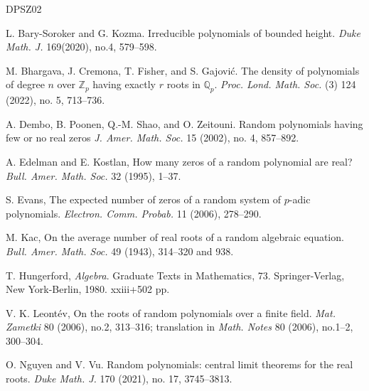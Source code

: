 \documentclass[12pt]{amsart}
\theoremstyle{definition}
\newcommand{\QQ}{\mathbb{Q} }
\newcommand{\ZZ}{\mathbb{Z} }
\begin{document}
\begin{thebibliography}{DPSZ02}

L. Bary-Soroker and G. Kozma.
Irreducible polynomials of bounded height.
{\em Duke Math. J.} 169(2020), no.4, 579--598.

M. Bhargava, J. Cremona, T. Fisher, and S. Gajovi\'c. 
The density of polynomials of degree $n$ over $\ZZ_p$ having exactly $r$ roots in $\QQ_p$.
{\em Proc. Lond. Math. Soc.} (3) 124 (2022), no. 5, 713--736.

A. Dembo, B. Poonen, Q.-M. Shao, and O. Zeitouni. 
Random polynomials having few or no real zeros
{\em J. Amer. Math. Soc.} 15 (2002), no. 4, 857--892.

A. Edelman and E. Kostlan, 
How many zeros of a random polynomial are real?
{\em Bull. Amer. Math. Soc.} 32 (1995), 1--37.

S. Evans, 
The expected number of zeros of a random system of $p$-adic polynomials.
{\em Electron. Comm. Probab.} 11 (2006), 278--290.

M. Kac, 
On the average number of real roots of a random algebraic equation. 
{\em Bull. Amer. Math. Soc.} 49 (1943), 314--320 and 938.

T. Hungerford,
{\em Algebra}.
Graduate Texts in Mathematics, 73.
Springer-Verlag, New York-Berlin, 1980. xxiii+502 pp.

V. K. Leont\'ev, 
On the roots of random polynomials over a finite field. 
{\em Mat. Zametki} 80 (2006), no.2, 313--316; translation in
{\em Math. Notes} 80 (2006), no.1--2, 300--304.

O. Nguyen and V. Vu.
Random polynomials: central limit theorems for the real roots.
{\em Duke Math. J.} 170 (2021), no. 17, 3745--3813.

\end{thebibliography}
\end{document}
